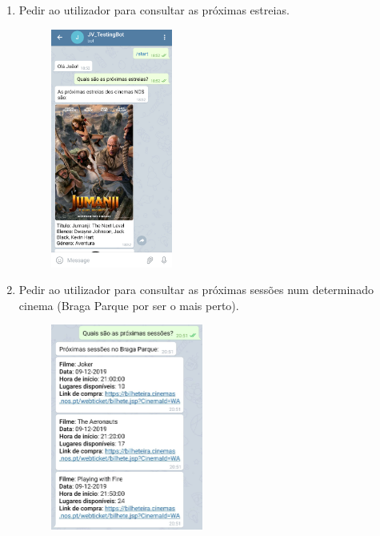 \documentclass[11pt, a4paper]{article}
\begin{document}
\begin{appendices}
\begin{enumerate}
\begin{figure}[H]
        \qquad
    \end{figure}
    \item Pedir ao utilizador para consultar as próximas estreias.
    \begin{figure}[H]
        \centering
        \includegraphics[width=4cm]{images/guiaoP/5.png}
    \end{figure}
    \item Pedir ao utilizador para consultar as próximas sessões num determinado cinema (Braga Parque por ser o mais perto).
    \begin{figure}[H]
        \centering
        \includegraphics[width=5cm]{images/guiaoP/6.png}

\end{figure}
\end{enumerate}
\end{appendices}
\end{document}
